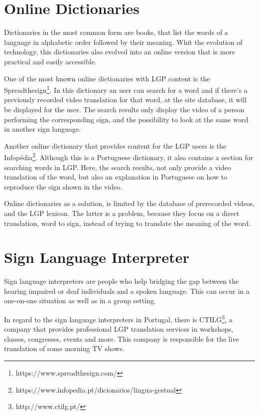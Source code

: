 \section{Online Dictionaries}

Dictionaries in the most common form are books, that list the words of a language in alphabetic order followed by their meaning.
Whit the evolution of technology, this dictionaries also evolved into an online version that is more practical and easily accessible.

One of the most known online dictionaries with \gls{LGP} content is the Spreadthesign\footnote{https://www.spreadthesign.com/}.
In this dictionary an user can search for a word and if there's a previously recorded video translation for that word, at the site database, it will be displayed for the user.
The search results only display the video of a person performing the corresponding sign, and the possibility to look at the same word in another sign language.

Another online dictionary that provides content for the \gls{LGP} users is the Infopédia\footnote{https://www.infopedia.pt/dicionarios/lingua-gestual}.
Although this is a Portuguese dictionary, it also contains a section for searching words in \gls{LGP}.
Here, the search results, not only provide a video translation of the word, but also an explanation in Portuguese on how to reproduce the sign shown in the video.

Online dictionaries as a solution, is limited by the database of prerecorded videos, and the \gls{LGP} lexicon.
The latter is a problem, because they focus on a direct translation, word to sign, instead of trying to translate the meaning of the word.

\section{Sign Language Interpreter}

Sign language interpreters are people who help bridging the gap between the hearing impaired or deaf individuals and a spoken language.
This can occur in a one-on-one situation as well as in a group setting.

In regard to the sign language interpreters in Portugal, there is CTILG\footnote{http://www.ctilg.pt/}, a company that provides professional \gls{LGP} translation services in workshops, classes, congresses, events and more.
This company is responsible for the live translation of some morning TV shows.


